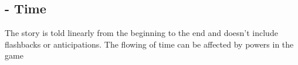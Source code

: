\subsection{- Time}
The story is told linearly from the beginning to the end and doesn't include flashbacks or 
anticipations. The flowing of time can be affected by powers in the game
